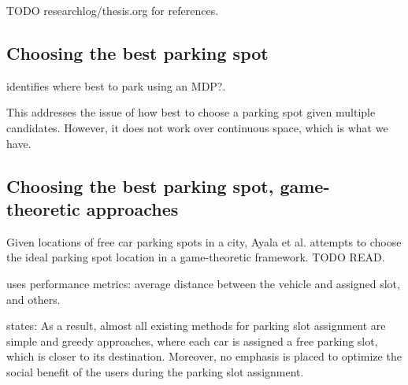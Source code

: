 TODO researchlog/thesis.org for references.


% 
% 
% 
% 
% 
% 
% 


\subsection{Choosing the best parking spot}
\cite{bogoslavskyi2015where} identifies where best to park using an MDP?.

This addresses the issue of how best to choose a parking spot given multiple
candidates. However, it does not work over continuous space, which is what we
have.

\subsection{Choosing the best parking spot, game-theoretic approaches}
Given locations of free car parking spots in a city, Ayala et al.
\cite{ayala2011parking} attempts to choose the ideal parking spot location
in a game-theoretic framework. TODO READ.
\cite{ayala2012parking}

\cite{mejri2014cooperation} uses performance metrics: average distance between
the vehicle and assigned slot, and others.

\cite{alfonsetti2014semi} states: 
As a result, almost all existing methods for parking slot assignment are simple
and greedy approaches, where each car is assigned a free parking slot, which is
closer to its destination. Moreover, no emphasis is placed to optimize the
social benefit of the users during the parking slot assignment. 


